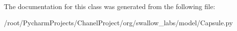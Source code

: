 The documentation for this class was generated from the following file\+:\begin{DoxyCompactItemize}
\item 
/root/\+Pycharm\+Projects/\+Chanel\+Project/org/swallow\+\_\+labs/model/Capsule.\+py\end{DoxyCompactItemize}

